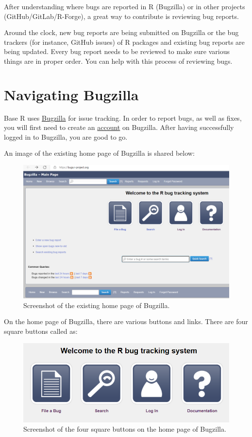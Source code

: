 \documentclass[
]{book}
\begin{document}
After understanding where bugs are reported in R (Bugzilla) or in other projects (GitHub/GitLab/R-Forge), a great way to contribute is reviewing bug reports.

Around the clock, new bug reports are being submitted on Bugzilla or the bug trackers (for instance, GitHub issues) of R packages and existing bug reports are being updated. Every bug report needs to be reviewed to make sure various things are in proper order. You can help with this process of reviewing bugs.

\hypertarget{Bugzilla}{%
\section{Navigating Bugzilla}\label{Bugzilla}}

Base R uses \href{https://bugs.r-project.org/}{Bugzilla} for issue tracking. In order to report bugs, as well as fixes, you will first need to create an \protect\hyperlink{RCorePkgBug}{account} on Bugzilla. After having successfully logged in to Bugzilla, you are good to go.

An image of the existing home page of Bugzilla is shared below:

\begin{figure}
\centering
\includegraphics{img/bugzilla.png}
\caption{Screenshot of the existing home page of Bugzilla.}
\end{figure}

On the home page of Bugzilla, there are various buttons and links. There are four square buttons called as:

\begin{figure}
\centering
\includegraphics{img/squarebuttons.png}
\caption{Screenshot of the four square buttons on the home page of Bugzilla.}
\end{figure}
\end{document}
